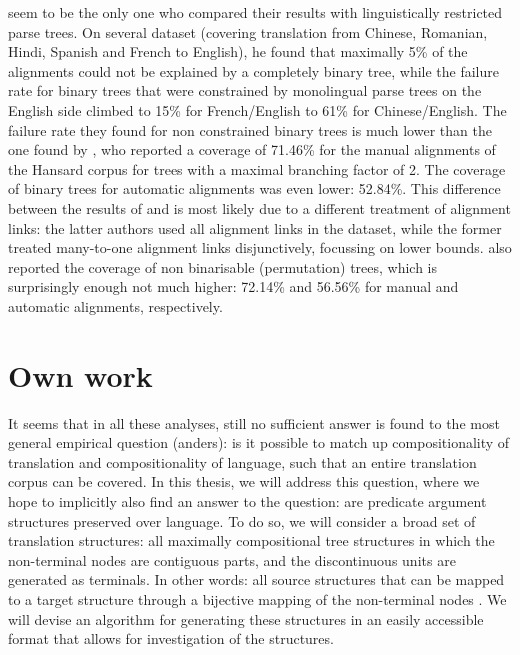 \documentclass{report}
\theoremstyle{definition}
\theoremstyle{plain}
\begin{document}
\cite{wellington2006empirical} seem to be the only one who compared their results with linguistically restricted parse trees. On several dataset (covering translation from Chinese, Romanian, Hindi, Spanish and French to English), he found that maximally 5\% of the alignments could not be explained by a completely binary tree, while the failure rate for binary trees that were constrained by monolingual parse trees on the English side climbed to 15\% for French/English to 61\% for Chinese/English. The failure rate they found for non constrained binary trees is much lower than the one found by \cite{simaan2013hats}, who reported a coverage of 71.46\% for the manual alignments of the Hansard corpus for trees with a maximal branching factor of 2. The coverage of binary trees for automatic alignments was even lower: 52.84\%. This difference between the results of \cite{wellington2006empirical} and \cite{simaan2013hats} is most likely due to a different treatment of alignment links: the latter authors used all alignment links in the dataset, while the former treated many-to-one alignment links disjunctively, focussing on lower bounds. \cite{simaan2013hats} also reported the coverage of non binarisable (permutation) trees, which is surprisingly enough not much higher: 72.14\% and 56.56\% for manual and automatic alignments, respectively.







\chapter{Own work}

It seems that in all these analyses, still no sufficient answer is found to the most general empirical question (anders): is it possible to match up compositionality of translation and compositionality of language, such that an entire translation corpus can be covered. In this thesis, we will address this question, where we hope to implicitly also find an answer to the question: are predicate argument structures preserved over language. To do so, we will consider a broad set of translation structures: all maximally compositional tree structures in which the non-terminal nodes are contiguous parts, and the discontinuous units are generated as terminals. In other words: all source structures that can be mapped to a target structure through a bijective mapping of the non-terminal nodes \citep[this set was previously defined in][]{simaan2013hats}. We will devise an algorithm for generating these structures in an easily accessible format that allows for investigation of the structures.
\end{document}
